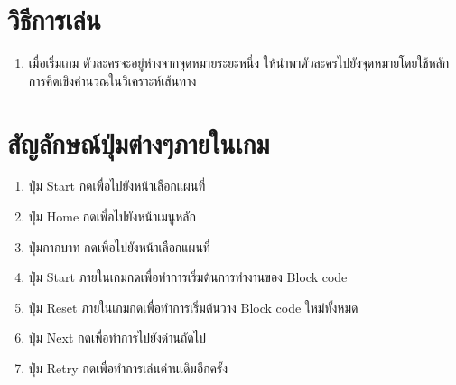 \section{วิธีการเล่น}
\begin{enumerate}
    \item เมื่อเริ่มเกม ตัวละครจะอยู่ห่างจากจุดหมายระยะหนึ่ง ให้นำพาตัวละครไปยังจุดหมายโดยใช้หลักการคิดเชิงคำนวณในวิเคราะห์เส้นทาง 
    
\end{enumerate}

\section{สัญลักษณ์ปุ่มต่างๆภายในเกม}
\begin{enumerate}
    \item ปุ่ม Start กดเพื่อไปยังหน้าเลือกแผนที่
    \item ปุ่ม Home กดเพื่อไปยังหน้าเมนูหลัก
    \item ปุ่มกากบาท กดเพื่อไปยังหน้าเลือกแผนที่
    \item ปุ่ม Start ภายในเกมกดเพื่อทำการเริ่มต้นการทำงานของ Block code
    \item ปุ่ม Reset ภายในเกมกดเพื่อทำการเริ่มต้นวาง Block code ใหม่ทั้งหมด
    \item ปุ่ม Next กดเพื่อทำการไปยังด่านถัดไป
    \item ปุ่ม  Retry กดเพื่อทำการเล่นด่านเดิมอีกครั้ง
    
\end{enumerate}

